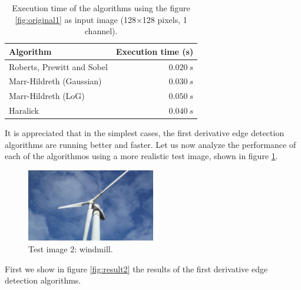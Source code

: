 \documentclass{ipol}
\numberwithin{equation}{section}
\numberwithin{table}{section}
\numberwithin{figure}{section}
\begin{document}
\begin{table}[t!]
	\begin{center}
	\begin{tabular}{| l | r |}
		\hline \rule{0pt}{3ex}
		\cellcolor[gray]{0.8} \textbf{Algorithm}	& \cellcolor[gray]{0.8} \textbf{Execution time (s)}	\\ \hline \rule{0pt}{3ex}
		Roberts, Prewitt and Sobel					& $0.020 \ s$										\\ \hline \rule{0pt}{3ex}
		Marr-Hildreth (Gaussian)					& $0.030 \ s$										\\ \hline \rule{0pt}{3ex}
		Marr-Hildreth (LoG)							& $0.050 \ s$										\\ \hline \rule{0pt}{3ex}
		Haralick									& $0.040 \ s$										\\
		\hline
	\end{tabular}
	\end{center}
	\caption{Execution time of the algorithms using the figure \ref{fig:original1} as input image (128$\times$128 pixels, 1 channel).}
	\label{exectime1}
\end{table}
\vspace{0.5cm}

It is appreciated that in the simplest cases, the first derivative edge detection algorithms are running better and faster. Let us now analyze the performance of each of the algorithmos using a more realistic test image, shown in figure \ref{fig:original2}. \\

\begin{figure}[t!]
	\centering
	\includegraphics[width=0.5\textwidth]{results/molino.jpg}
	\caption{Test image 2: windmill.}
	\label{fig:original2}
\end{figure}

First we show in figure \ref{fig:result2} the results of the first derivative edge detection algorithms.
\end{document}

